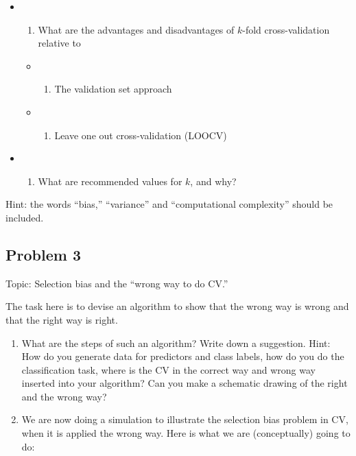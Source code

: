 \documentclass[
]{article}
\providecommand{\tightlist}{%
  \setlength{\itemsep}{0pt}\setlength{\parskip}{0pt}}
\begin{document}
\begin{itemize}
\item
  \begin{enumerate}
  \def\labelenumi{\alph{enumi})}
  \tightlist
  \item
    What are the advantages and disadvantages of \(k\)-fold
    cross-validation relative to
  \end{enumerate}

  \begin{itemize}
  \tightlist
  \item
    \begin{enumerate}
    \def\labelenumi{\roman{enumi})}
    \tightlist
    \item
      The validation set approach
    \end{enumerate}
  \item
    \begin{enumerate}
    \def\labelenumi{\roman{enumi})}
    \setcounter{enumi}{1}
    \tightlist
    \item
      Leave one out cross-validation (LOOCV)
    \end{enumerate}
  \end{itemize}
\item
  \begin{enumerate}
  \def\labelenumi{\alph{enumi})}
  \setcounter{enumi}{1}
  \tightlist
  \item
    What are recommended values for \(k\), and why?
  \end{enumerate}
\end{itemize}

Hint: the words ``bias,'' ``variance'' and ``computational complexity''
should be included.

\subsection{Problem 3}\label{problem-3}

Topic: Selection bias and the ``wrong way to do CV.''

The task here is to devise an algorithm to show that the wrong way is
wrong and that the right way is right.

\begin{enumerate}
\def\labelenumi{\alph{enumi})}
\item
  What are the steps of such an algorithm? Write down a suggestion.
  Hint: How do you generate data for predictors and class labels, how do
  you do the classification task, where is the CV in the correct way and
  wrong way inserted into your algorithm? Can you make a schematic
  drawing of the right and the wrong way?
\item
  We are now doing a simulation to illustrate the selection bias problem
  in CV, when it is applied the wrong way. Here is what we are
  (conceptually) going to do:
\end{enumerate}
\end{document}
